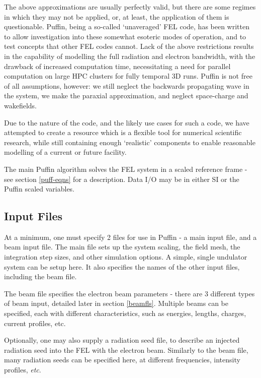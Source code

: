 \documentclass[12pt]{article}%
\begin{document}
The above approximations are usually perfectly valid, but there are some regimes in which they may not be applied, or, at least, the application of them is questionable. Puffin, being a so-called `unaveraged' FEL code, has been written to allow investigation into these somewhat esoteric modes of operation, and to test concepts that other FEL codes cannot. Lack of the above restrictions results in the capability of modelling the full radiation and electron bandwidth, with the drawback of increased computation time, necessitating a need for parallel computation on large HPC clusters for fully temporal 3D runs. Puffin is not free of all assumptions, however: we still neglect the backwards propagating wave in the system, we make the paraxial approximation, and neglect space-charge and wakefields.

Due to the nature of the code, and the likely use cases for such a code, we have attempted to create a resource which is a flexible tool for numerical scientific research, while still containing enough `realistic'  components to enable reasonable modelling of a current or future facility.




The main Puffin algorithm solves the FEL system in a scaled reference frame - see section \ref{puff-eqns} for a description. Data I/O may be in either SI or the Puffin scaled variables.




\subsection{Input Files}

At a minimum, one must specify 2 files for use in Puffin - a main input file, and a beam input file. The main file sets up the system scaling, the field mesh, the integration step sizes, and other simulation options. A simple, single undulator system can be setup here. It also specifies the names of the other input files, including the beam file.

The beam file specifies the electron beam parameters - there are 3 different types of beam input, detailed later in section \ref{beamfls}. Multiple beams can be specified, each with different characteristics, such as energies, lengths, charges, current profiles, etc.

Optionally, one may also supply a radiation seed file, to describe an injected radiation seed into the FEL with the electron beam. Similarly to the beam file, many radiation seeds can be specified here, at different frequencies, intensity profiles, \textit{etc}.
\end{document}
